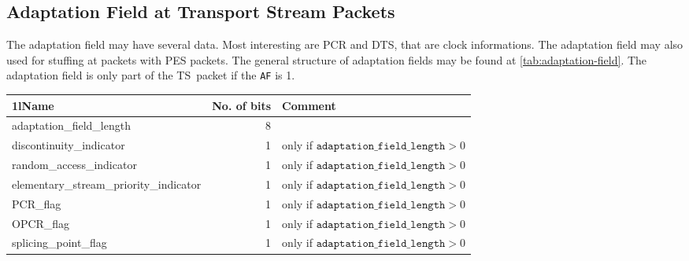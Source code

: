\documentclass{scrartcl}
\providecommand*\toprule{\hline}
\providecommand*\midrule{\hline}
\begin{document}
\subsection{Adaptation Field at Transport Stream Packets}
\label{sec:adaptation-field}

The adaptation field may have several data. Most interesting are PCR and DTS,
that are clock informations. The adaptation field may also used for stuffing
at packets with PES packets. The general structure of adaptation fields may be
found at \autoref{tab:adaptation-field}. The adaptation field is only part of
the TS~packet if the \texttt{AF} is 1.

\begin{table}\small
  \begin{addmargin}[-4em]{-4em}
    \addtolength{\textwidth}{8em}
  \begin{tabularx}{\textwidth}{>{\ttfamily}lr>{\raggedright}X}
    \toprule
    \multicolumn1l{Name} & \hspace{-2em}No. of bits & Comment \tabularnewline
    \midrule
    adaptation\_field\_length      &  8 & \tabularnewline
    discontinuity\_indicator       &  1 & only if 
                                          $\texttt{adaptation\_field\_length} >
                                          0$
                                          \tabularnewline
    random\_access\_indicator      &  1 & only if 
                                          $\texttt{adaptation\_field\_length} >
                                          0$
                                          \tabularnewline
    elementary\_stream\_priority\_indicator 
                                   &  1 & only if 
                                          $\texttt{adaptation\_field\_length} >
                                          0$
                                          \tabularnewline
    PCR\_flag                      &  1 & only if 
                                          $\texttt{adaptation\_field\_length} >
                                          0$
                                          \tabularnewline
    OPCR\_flag                     &  1 & only if 
                                          $\texttt{adaptation\_field\_length} >
                                          0$
                                          \tabularnewline
    splicing\_point\_flag          &  1 & only if 
                                          $\texttt{adaptation\_field\_length} >
                                          0$

\end{tabularx}
\end{addmargin}
\end{table}
\end{document}
